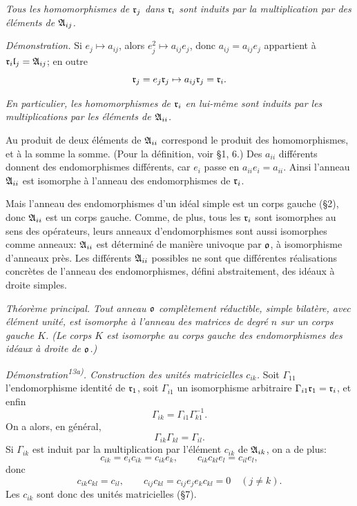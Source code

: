 \emph{Tous les homomorphismes de $\mathfrak{r}_j$ dans $\mathfrak{r}_i$ sont induits par la multiplication par des éléments de $\mathfrak{A}_{ij}$.}

\emph{Démonstration.} Si $e_j\mapsto a_{ij}$, alors $e_j^2\mapsto a_{ij}e_j$, donc $a_{ij}=a_{ij}e_j$ appartient à $\mathfrak{r}_i\mathfrak{l}_j=\mathfrak{A}_{ij}$; en outre
\[
        \mathfrak{r}_j=e_j\mathfrak{r}_j\mapsto a_{ij}\mathfrak{r}_j=\mathfrak{r}_i.
\]

\emph{En particulier, les homomorphismes de $\mathfrak{r}_i$ en lui-même sont induits par les multiplications par les éléments de $\mathfrak{A}_{ii}$.}

Au produit de deux éléments de $\mathfrak{A}_{ii}$ correspond le produit des homomorphismes, et à la somme la somme. (Pour la définition, voir \S{}1, 6.) Des $a_{ii}$ différents donnent des endomorphismes différents, car $e_i$ passe en $a_{ii}e_i=a_{ii}$. Ainsi l'anneau $\mathfrak{A}_{ii}$ est isomorphe à l'anneau des endomorphismes de $\mathfrak{r}_i$.

Mais l'anneau des endomorphismes d'un idéal simple est un corps gauche (\S{}2), donc $\mathfrak{A}_{ii}$ est un corps gauche. Comme, de plus, tous les $\mathfrak{r}_i$ sont isomorphes au sens des opérateurs, leurs anneaux d'endomorphismes sont aussi isomorphes comme anneaux: $\mathfrak{A}_{ii}$ est déterminé de manière univoque par $\mathfrak{o}$, à isomorphisme d'anneaux près. Les différents $\mathfrak{A}_{ii}$ possibles ne sont que différentes réalisations concrètes de l'anneau des endomorphismes, défini abstraitement, des idéaux à droite simples.

\emph{Théorème principal. Tout anneau $\mathfrak{o}$ complètement réductible, simple bilatère, avec élément unité, est isomorphe à l'anneau des matrices de degré $n$ sur un corps gauche $K$. (Le corps $K$ est isomorphe au corps gauche des endomorphismes des idéaux à droite de $\mathfrak{o}$.)}

\emph{Démonstration\textsuperscript{13a)}. Construction des unités matricielles $c_{ik}$.} Soit $\Gamma_{11}$ l'endomorphisme identité de $\mathfrak{r}_1$, soit $\Gamma_{i1}$ un isomorphisme arbitraire $\Gamma_{i1}\mathfrak{r}_1=\mathfrak{r}_i$, et enfin
\[
        \Gamma_{ik}=\Gamma_{i1}\Gamma_{k1}^{-1}.
\]
On a alors, en général,
\[
        \Gamma_{ik}\Gamma_{kl}=\Gamma_{il}.
\]
Si $\Gamma_{ik}$ est induit par la multiplication par l'élément $c_{ik}$ de $\mathfrak{A}_{ik}$, on a de plus:
\[
        c_{ik}=e_i c_{ik}=c_{ik}e_k,
        \qquad
        c_{ik}c_{kl}e_l=c_{il}e_l,
\]
donc
\[
        c_{ik}c_{kl}=c_{il},
        \qquad
        c_{ij}c_{kl}=c_{ij}e_j e_k c_{kl}=0\quad(j\ne k).
\]
Les $c_{ik}$ sont donc des unités matricielles (\S{}7).


